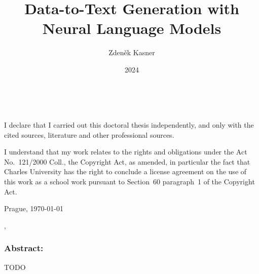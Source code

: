 \documentclass[12pt,notitlepage,a4paper,openright]{report}
\title{Data-to-Text Generation with Neural Language Models}
\author{Zdeněk Kasner}
\date{2024}
\begin{document}
%
%
%
\renewcommand{\thepage}{\roman{page}}
\renewcommand\cite{\citep}
\maketitle

\pagestyle{plain}
\normalsize
\setcounter{page}{2}

\cleardoublepage{}
\ \vspace{10mm}

\noindent \it

\vspace{\fill}
\noindent \rm
I declare that I carried out this doctoral thesis independently,
and only with the cited sources, literature and other professional sources.

I understand that my work relates to the rights and obligations
under the Act No.~121/2000 Coll., the Copyright Act, as amended,
in particular the fact that Charles University has the right
to conclude a license agreement on the use of this work as a school work
pursuant to Section~60 paragraph~1 of the Copyright Act.

\vspace{2cm}
\noindent Prague, \today \hspace{\fill}\theauthor %



\cleardoublepage{} %
\pagestyle{plain}


\begin{description}[leftmargin=7.5em,labelwidth=7em,labelindent=0em,labelsep=0.5em]
  \item[Title:] \thetitle{}
  \item[Author:] \theauthor{}
  \item[Department:] \thedept{}
  \item[Supervisor:] \thesupervisor{},\\ \thedept{}
\end{description}
\subsubsection{Abstract:}



\begin{description}[leftmargin=7.5em,labelwidth=7em,labelindent=0em,labelsep=0.5em]
  \item[Keywords:] TODO
\end{description}
\end{document}
